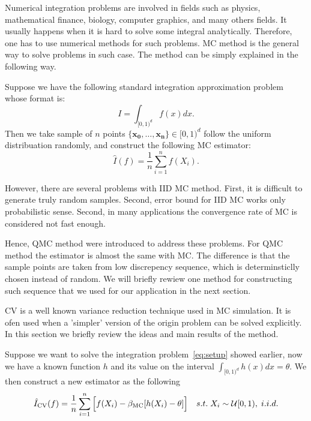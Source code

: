 
Numerical integration problems are involved in fields such as physics, mathematical finance, biology, computer graphics, and many others fields. 
It usually happens when it is hard to solve some integral analytically. Therefore, one has to use numerical methods for such problems.  
MC method is the general way to solve problems in such case\cite{fishman2013monte}. The method can be simply explained in the following way. 

Suppose we have the following standard integration approximation problem whose format is: 
\begin{equation}
    \label{eq:setup}
    I= \int_{[0,1)^d}f(x)dx.
\end{equation}
Then we take sample of $n$ points $\{\mathbf{x_0},\dots, \mathbf{x_n}\}\in [0,1)^d$ follow the uniform distribuation randomly, and construct the following MC estimator:
\[
\hat{I}(f)=\frac{1}{n}\sum_{i=1}^{n}f(X_i).
\]

However, there are several problems with IID MC method\cite{niederreiter2010quasi}.
First, it is difficult to generate truly random samples. Second, error bound for IID MC works only probabilistic sense. 
Second, in many applications the convergence rate of MC is considered not fast enough. 

Hence, QMC method were introduced to address these problems. 
For QMC method the estimator is almost the same with MC. 
The difference is that the sample points are taken from low discrepency sequence, which is determinsticlly chosen instead of random.   
We will briefly rewiew one method for constructing such sequence that we used for our application in the next section. 





CV is a well known variance reduction technique used in MC simulation. 
It is ofen used when a 'simpler' version of the origin problem can be solved explicitly. In this section we briefly review the ideas and main results of the method.
 
Suppose we want to solve the integration problem~\eqref{eq:setup} showed earlier, now we have a known function $h$ and its value on the interval
$\int_{[0,1)^d} h(x)dx = \theta$.  We then construct a new estimator as the following 
\[\hat{I}_{\mathrm{CV}}(f)=\frac{1}{n}\sum_{i=1}^{n}\Big[ f(X_i)-\beta_{\mathrm{MC}}[h(X_i)-\theta] \Big] \quad s.t.\; X_i\sim \mathcal{U}[0,1), \; i.i.d.\]

